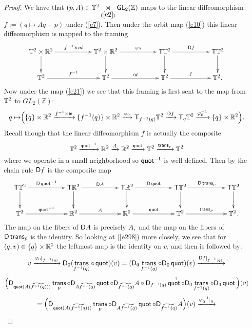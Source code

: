 \documentclass{amsart}
\theoremstyle{definition}
\theoremstyle{remark}
\newcommand{\xra}{\xrightarrow}
\DeclareMathOperator{\GL}{\sf GL}
\DeclareMathOperator{\quot}{\sf quot}
\DeclareMathOperator{\id}{\sf id}
\DeclareMathOperator{\trans}{\sf trans}
\begin{document}
\begin{proof}
We have that $(p, A) \in \TT^2 \underset{(\ref{e2})}\rtimes \GL_2(\ZZ)$ maps to the linear diffeomorphism $f :=(q \mapsto Aq + p)$ under (\ref{e7}). Then under the orbit map (\ref{e10}) this linear diffeomorphism is mapped to the framing \[ \xymatrix{
\TT^{2} \times \RR^{2} \ar[d] \ar[rr]^-{f^{-1} \times id} && \TT^{2} \times \RR^{2} \ar[rr]^-{\varphi_{0}} 
\ar[d] && {\sT}\TT^{2} \ar[rr]^-{\sD f} \ar[d] && {\sT}\TT^{2} \ar[d] \\
\TT^{2} \ar[rr]^-{f^{-1}} && \TT^{2}  \ar[rr]^-{id} && \TT^{2} \ar[rr]^-{f} && \TT^{2}.}\] Now under the map (\ref{e21}) we see that this framing is first sent to the map from $\mathbb T^{2}$ to $ GL_{2}(\mathbb{Z}):$ \begin{equation}\label{e298} q \mapsto \Bigr( \{q\} \times \RR^{2} \xra{f^{-1} \times \id} \{f^{-1}(q)\} \times \RR^{2} \xra{\varphi_{0}} {\sT}_{f^{-1}(q)} \TT^{2} \xra{{\sD} f} {\sT}_{q} \TT^{2} \xra{\varphi^{-1}_{0}} \{q\} \times \RR^{2} \Bigl). \end{equation} 
Recall though that the linear diffeomorphism $f$ is actually the composite $$\TT^{2} \xra{\quot^{-1}} \RR^{2}  \xra{A}  \RR^{2} \xra{\quot} \TT^{2} \xra{\trans_{p}} \TT^{2}$$ where we operate in a small neighborhood so ${\sf \quot^{-1}}$ is well defined.
Then by the chain rule ${{\mathsf D} f}$ is the composite map
\[ \xymatrix{
{\sT} \TT^{2} \ar[d] \ar[rr]^-{{\sD} \quot^{-1}} && \sT \RR^{2} \ar[rr]^-{\sD A} 
\ar[d] && \sT \RR^{2} \ar[rr]^-{\sD \quot} \ar[d] && {\sT}\TT^{2} \ar[d] \ar[rr]^-{\sD \trans_{p}} && \ar[d]{\sT} \TT^{2} \\
\TT^{2} \ar[rr]^-{\quot^{-1}} && \RR^{2}  \ar[rr]^-{A} && \RR^{2} \ar[rr]^-{\quot} && \TT^{2} \ar[rr]^-{\trans_{p}} &&  \TT^{2}.} \] 
The map on the fibers of $\mathsf D A$ is precisely $A,$ and the map on the fibers of $\sD \trans_{p}$ is the identity. So looking at (\ref{e298}) more closely, we see that for $(q, v) \in \{q\} \times \mathbb R^{2}$ the leftmost map is the identity on $v$, and then is followed by: 
$$v \xra{\varphi_{0}|_{f^{-1}(q)}} \sD_{0}(\trans_{f^{-1}(q)} \circ \quot) (v) = (\sD_{0} \trans_{f^{-1}(q)} \circ \sD_{0} \quot) (v) \xra{\sD f|_{f^{-1}(q)}}$$  
$$\Big(\sD_{\quot(A(\widetilde{f^{-1}(q)}))} \trans_{p} \circ \sD_{A\widetilde{f^{-1}(q)}} \quot \circ \sD_{\widetilde{f^{-1}(q)}} A \circ \sD_{f^{-1}(q)} \quot^{-1} \circ \sD_{0} \trans_{f^{-1}(q)} \circ \sD_{0} \quot \Big) (v)$$
$$= \Big(\sD_{\quot(A(\widetilde{f^{-1}(q)}))} \trans_{p} \circ \sD_{A\widetilde{f^{-1}(q)}} \quot \circ \sD_{\widetilde{f^{-1}(q)}} A \Big) (v) \xra{\varphi_{0}^{-1}|_{q}}$$

\end{proof}
\end{document}
